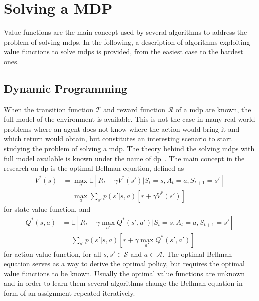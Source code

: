 \section{Solving a MDP}
Value functions are the main concept used by several algorithms to address the problem of solving \glspl{mdp}. In the following, a description of algorithms exploiting value functions to solve \glspl{mdp} is provided, from the easiest case to the hardest ones.

\subsection{Dynamic Programming}
When the transition function $\mathcal{T}$ and reward function $\mathcal{R}$ of a \gls{mdp} are known, the full model of the environment is available. This is not the case in many real world problems where an agent does not know where the action would bring it and which return would obtain, but constitutes an interesting scenario to start studying the problem of solving a \gls{mdp}. The theory behind the solving \glspl{mdp} with full model available is known under the name of \gls{dp}~\cite{bertsekas2005dynamic, bellman2013dynamic}. The main concept in the research on \gls{dp} is the optimal Bellman equation, defined as
\begin{align}
 V^*(s) &= \max_a \mathbb{E}[R_t + \gamma V^*(s') | S_t = s, A_t = a, S_{t+1} = s']\nonumber\\
        &= \max_a \sum_{s'} p(s' | s, a)[r + \gamma V^*(s')]
\end{align}
for state value function, and
\begin{align}
 Q^*(s,a) &= \mathbb{E}[R_t + \gamma \max_{a'}Q^*(s', a') | S_t = s, A_t = a, S_{t+1} = s']\nonumber\\
          &= \sum_{s'} p(s' | s, a)[r + \gamma \max_{a'}Q^*(s', a')]
\end{align}
for action value function, for all $s, s' \in \mathcal{S}$ and $a \in \mathcal{A}$.
The optimal Bellman equation serves as a way to derive the optimal policy, but requires the optimal value functions to be known. Usually the optimal value functions are unknown and in order to learn them several algorithms change the Bellman equation in form of an assignment repeated iteratively.

